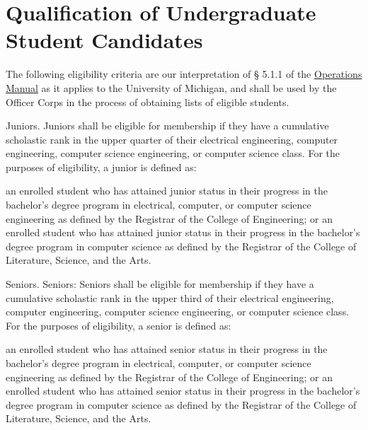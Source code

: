 
\section{Qualification of Undergraduate Student Candidates} 
The following eligibility criteria are our interpretation of § 5.1.1 of the \hkn \href{http://www.ieee.org/education_careers/education/ieee_hkn/about/operations_manual.pdf}{Operations Manual} as it applies to the University of Michigan, and shall be used by the Officer Corps in the process of obtaining lists of eligible students.


\begin{enumsubsection}
\itemnotoc Juniors. Juniors shall be eligible for membership if they have a cumulative scholastic rank in the upper quarter of their electrical engineering, computer engineering, computer science engineering, or computer science class. For the purposes of eligibility, a junior is defined as:
\begin{enumsubsubsection}
\itemnotoc an enrolled student who has attained junior status in their progress in the bachelor's degree program in electrical, computer, or computer science engineering as defined by the Registrar of the College of Engineering; or
\itemnotoc an enrolled student who has attained junior status in their progress in the bachelor's degree program in computer science as defined by the Registrar of the College of Literature, Science, and the Arts.
\end{enumsubsubsection}

\itemnotoc Seniors. Seniors: Seniors shall be eligible for membership if they have a cumulative scholastic rank in the upper third of their electrical engineering, computer engineering, computer science engineering, or computer science class. For the purposes of eligibility, a senior is defined as:
\begin{enumsubsubsection}
\itemnotoc an enrolled student who has attained senior status in their progress in the bachelor's degree program in electrical, computer, or computer science engineering as defined by the Registrar of the College of Engineering; or
\itemnotoc an enrolled student who has attained senior status in their progress in the bachelor's degree program in computer science as defined by the Registrar of the College of Literature, Science, and the Arts.
\end{enumsubsubsection}

\end{enumsubsection}

